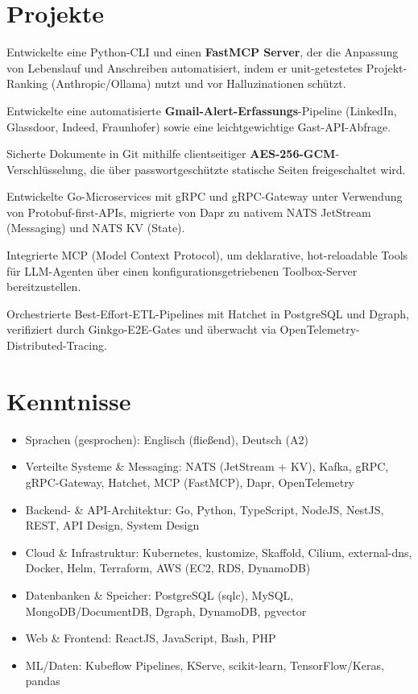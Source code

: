 \documentclass[10pt,a4paper]{resume}
\begin{document}
\section{Projekte}

\bullets
  \item Entwickelte eine Python-CLI und einen \textbf{FastMCP Server}, der die Anpassung von Lebenslauf und Anschreiben automatisiert, indem er unit-getestetes Projekt-Ranking (Anthropic/Ollama) nutzt und vor Halluzinationen schützt.
  \item Entwickelte eine automatisierte \textbf{Gmail-Alert-Erfassungs}-Pipeline (LinkedIn, Glassdoor, Indeed, Fraunhofer) sowie eine leichtgewichtige Gast-API-Abfrage.
  \item Sicherte Dokumente in Git mithilfe clientseitiger \textbf{AES-256-GCM}-Verschlüsselung, die über passwortgeschützte statische Seiten freigeschaltet wird.
\bulletsend
\vspace{1.0pt}
\bullets
  \item Entwickelte Go-Microservices mit gRPC und gRPC-Gateway unter Verwendung von Protobuf-first-APIs, migrierte von Dapr zu nativem NATS JetStream (Messaging) und NATS KV (State).
  \item Integrierte MCP (Model Context Protocol), um deklarative, hot-reloadable Tools für LLM-Agenten über einen konfigurationsgetriebenen Toolbox-Server bereitzustellen.
  \item Orchestrierte Best-Effort-ETL-Pipelines mit Hatchet in PostgreSQL und Dgraph, verifiziert durch Ginkgo-E2E-Gates und überwacht via OpenTelemetry-Distributed-Tracing.
\bulletsend

\section{Kenntnisse}

\begin{itemize}[leftmargin=1.4em,nosep,topsep=2pt]
  \item Sprachen (gesprochen): Englisch (fließend), Deutsch (A2)
  \item Verteilte Systeme \& Messaging: NATS (JetStream + KV), Kafka, gRPC, gRPC-Gateway, Hatchet, MCP (FastMCP), Dapr, OpenTelemetry
  \item Backend- \& API-Architektur: Go, Python, TypeScript, NodeJS, NestJS, REST, API Design, System Design
  \item Cloud \& Infrastruktur: Kubernetes, kustomize, Skaffold, Cilium, external-dns, Docker, Helm, Terraform, AWS (EC2, RDS, DynamoDB)
  \item Datenbanken \& Speicher: PostgreSQL (sqlc), MySQL, MongoDB/DocumentDB, Dgraph, DynamoDB, pgvector
  \item Web \& Frontend: ReactJS, JavaScript, Bash, PHP
  \item ML/Daten: Kubeflow Pipelines, KServe, scikit-learn, TensorFlow/Keras, pandas
\end{itemize}
\end{document}
